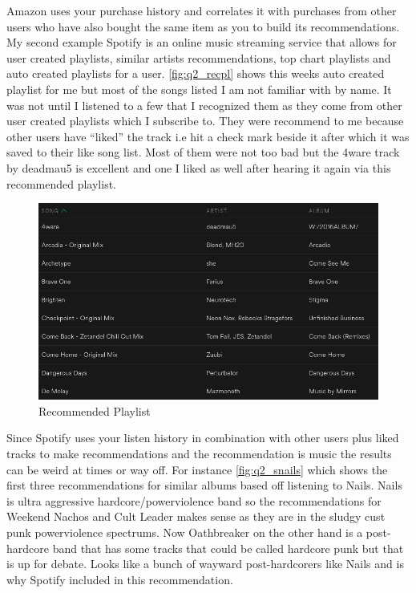 \documentclass[11pt]{article}
\begin{document}
\noindent Amazon uses your purchase history and correlates it with purchases from other users who have also bought the same item as you to build its recommendations. My second example Spotify is an online music streaming service that allows for user created playlists, similar artists recommendations, top chart playlists and auto created playlists for a user.  \autoref{fig:q2_recpl} shows this weeks auto created playlist for me but most of the songs listed I am not familiar with by name. It was not until I listened to a few that I recognized them as they come from other user created playlists which I subscribe to. They were recommend to me because other users have \enquote{liked} the track i.e hit a check mark beside it after which it was saved to their like song list. Most of them were not too bad but the 4ware track by deadmau5 is excellent and one I liked as well after hearing it again via this recommended playlist.
\begin{figure}[H]
\centering
\includegraphics[scale=.6]{spotify_discover2.png}
   \caption{Recommended Playlist}
          \label{fig:q2_recpl}
\end{figure}
Since Spotify uses your listen history in combination with other users plus liked tracks to make recommendations and the recommendation is music the results can be weird at times or way off. For instance \autoref{fig:q2_snails} which shows the first three recommendations for similar albums based off listening to Nails. Nails is ultra aggressive hardcore/powerviolence band so the recommendations for Weekend Nachos and Cult Leader makes sense as they are in the sludgy cust punk powerviolence spectrums. Now Oathbreaker on the other hand is a post-hardcore band that has some tracks that could be called hardcore punk but that is up for debate. Looks like a bunch of wayward post-hardcorers like Nails and is why Spotify included in this recommendation.
\end{document}
